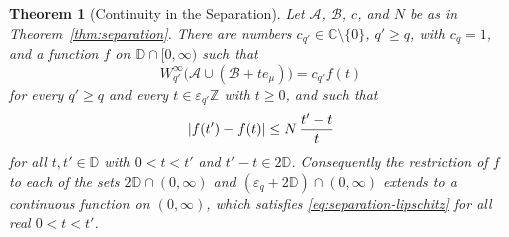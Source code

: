 \documentclass[11pt]{preprint}
\DeclarePairedDelimiter{\abs}{\lvert}{\rvert}
\numberwithin{equation}{section}
\newtheorem{theorem}{Theorem}[section]
\theoremstyle{definition}
\theoremstyle{remark}
\theoremstyle{plain}
\begin{document}
\begin{theorem}[Continuity in the Separation]\label{thm:separation-continuity}
Let $\mathcal A$, $\mathcal B$, $c$, and $N$ be as in Theorem~\ref{thm:separation}. There are numbers $c_{q'} \in \mathbb C \setminus \{ 0 \}$, $q' \geq q$, with $c_q = 1$, and a function $f$ on $\mathbb D \cap [0, \infty)$ such that
\begin{equation}\label{eq:level-proportionality}
    W^\infty_{q'}\bigl(\mathcal A \cup (\mathcal B + te_\mu)\bigr) = c_{q'}f(t)
\end{equation}
for every $q' \geq q$ and every $t \in \varepsilon_{q'}\mathbb Z$ with $t \geq 0$, and such that
\begin{equation}\label{eq:separation-lipschitz}
    \abs{f(t') - f(t)} \leq N\,\frac{t' - t}{t}
\end{equation}
for all $t, t' \in \mathbb D$ with $0 < t < t'$ and $t' - t \in 2\mathbb D$. Consequently the restriction of $f$ to each of the sets $2\mathbb D \cap (0, \infty)$ and $(\varepsilon_q + 2\mathbb D) \cap (0, \infty)$ extends to a continuous function on $(0, \infty)$, which satisfies \eqref{eq:separation-lipschitz} for all real $0 < t < t'$.
\end{theorem}
\end{document}
